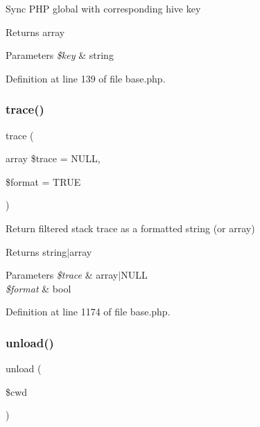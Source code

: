 Sync P\+HP global with corresponding hive key \begin{DoxyReturn}{Returns}
array 
\end{DoxyReturn}

\begin{DoxyParams}{Parameters}
{\em \$key} & string \\
\hline
\end{DoxyParams}


Definition at line 139 of file base.\+php.

\hypertarget{class_base_a83230924155c911fd8db8f0619ced19a}{}\label{class_base_a83230924155c911fd8db8f0619ced19a} 
\subsubsection{\texorpdfstring{trace()}{trace()}}
{\footnotesize\ttfamily trace (\begin{DoxyParamCaption}\item[{array}]{\$trace = {\ttfamily NULL},  }\item[{}]{\$format = {\ttfamily TRUE} }\end{DoxyParamCaption})}

Return filtered stack trace as a formatted string (or array) \begin{DoxyReturn}{Returns}
string$\vert$array 
\end{DoxyReturn}

\begin{DoxyParams}{Parameters}
{\em \$trace} & array$\vert$\+N\+U\+LL \\
\hline
{\em \$format} & bool \\
\hline
\end{DoxyParams}


Definition at line 1174 of file base.\+php.

\hypertarget{class_base_adc7d192011936335400f5baffa3c2667}{}\label{class_base_adc7d192011936335400f5baffa3c2667} 
\subsubsection{\texorpdfstring{unload()}{unload()}}
{\footnotesize\ttfamily unload (\begin{DoxyParamCaption}\item[{}]{\$cwd }\end{DoxyParamCaption})}

